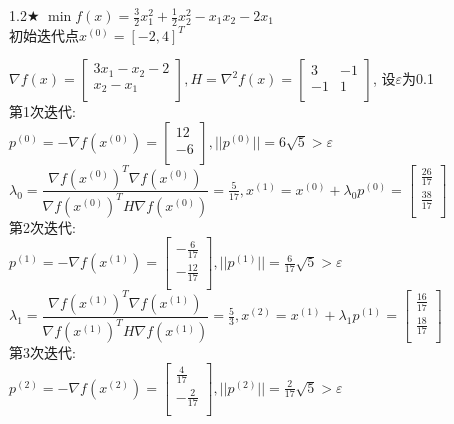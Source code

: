 \begin{problem}{1.2$\bigstar$}
    $\min f(x)=\frac{3}{2}x_1^2+\frac{1}{2}x_2^2-x_1x_2-2x_1$\\
    初始迭代点${x^{(0)}}=[-2,4]^T$
\end{problem}
\begin{solution}
    $\nabla f(x)=\begin{bmatrix}
        3x_1-x_2-2  \\
        x_2-x_1  \\
    \end{bmatrix}, H=\nabla^2 f(x)=\begin{bmatrix}
        3   & -1  \\
        -1  & 1  \\
    \end{bmatrix}$,
    设$\varepsilon$为0.1\\
    第1次迭代:\\
    $p^{(0)}=-\nabla f(x^{(0)})=\begin{bmatrix} 12\\-6\\\end{bmatrix},||p^{(0)}||=6\sqrt{5}>\varepsilon$\\
    $\lambda_0=\dfrac{\nabla f(x^{(0)})^T\nabla f(x^{(0)})}{\nabla f(x^{(0)})^TH\nabla f(x^{(0)})}=\frac{5}{17},x^{(1)}=x^{(0)}+\lambda_0p^{(0)}=\begin{bmatrix} \frac{26}{17}\\\frac{38}{17}\\\end{bmatrix}$\\
    第2次迭代:\\
    $p^{(1)}=-\nabla f(x^{(1)})=\begin{bmatrix} -\frac{6}{17}\\-\frac{12}{17}\\\end{bmatrix},||p^{(1)}||=\frac{6}{17}\sqrt{5}>\varepsilon$\\
    $\lambda_1=\dfrac{\nabla f(x^{(1)})^T\nabla f(x^{(1)})}{\nabla f(x^{(1)})^TH\nabla f(x^{(1)})}=\frac{5}{3},x^{(2)}=x^{(1)}+\lambda_1p^{(1)}=\begin{bmatrix} \frac{16}{17}\\\frac{18}{17}\\\end{bmatrix}$\\
    第3次迭代:\\
    $p^{(2)}=-\nabla f(x^{(2)})=\begin{bmatrix} \frac{4}{17}\\-\frac{2}{17}\\\end{bmatrix},||p^{(2)}||=\frac{2}{17}\sqrt{5}>\varepsilon$\\

\end{solution}
